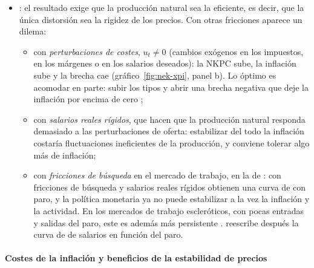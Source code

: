\documentclass[11pt]{article}
\begin{document}
\begin{itemize}
\item {}: el resultado exige que la producción natural sea la eficiente, es decir, que la única distorsión sea la rigidez de los precios. Con otras fricciones aparece un dilema\nocite{Gali2018State}:
  \begin{itemize}
  \item con \emph{perturbaciones de costes}, $u_t\neq0$ (cambios exógenos en los impuestos, en los márgenes o en los salarios deseados): la NKPC sube, la inflación sube y la brecha cae (gráfico~\ref{fig:nek-xpi}, panel b). Lo óptimo es acomodar en parte: subir los tipos y abrir una brecha negativa que deje la inflación por encima de cero\nocite{ClaridaGaliGertler1999Science} ;
  \item con \emph{salarios reales rígidos}, que hacen que la producción natural responda demasiado a las perturbaciones de oferta: estabilizar del todo la inflación costaría fluctuaciones ineficientes de la producción, y conviene tolerar algo más de inflación\nocite{BlanchardGali2007Real};
  \item con \emph{fricciones de búsqueda} en el mercado de trabajo, en la  de \textcite{BlanchardGali2010Labor}: con fricciones de búsqueda y salarios reales rígidos obtienen una curva de  con paro, y la política monetaria ya no puede estabilizar a la vez la inflación y la actividad. En los mercados de trabajo escleróticos, con pocas entradas y salidas del paro, este es además más persistente  . \textcite{Gali2011Return} reescribe después la curva de  de salarios en función del paro.
  \end{itemize}
\end{itemize}

\paragraph{Costes de la inflación y beneficios de la estabilidad de precios}
\end{document}
